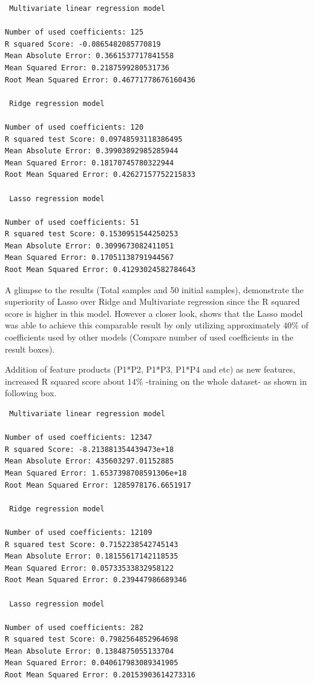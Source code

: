 \documentclass[12pt]{article}
\begin{document}
\begin{lstlisting}
 Multivariate linear regression model

Number of used coefficients: 125
R squared Score: -0.0865482085770819
Mean Absolute Error: 0.3661537717841558
Mean Squared Error: 0.2187599280531736
Root Mean Squared Error: 0.46771778676160436

 Ridge regression model

Number of used coefficients: 120
R squared test Score: 0.09748593118386495
Mean Absolute Error: 0.39903892985285944
Mean Squared Error: 0.18170745780322944
Root Mean Squared Error: 0.42627157752215833

 Lasso regression model

Number of used coefficients: 51
R squared test Score: 0.1530951544250253
Mean Absolute Error: 0.3099673082411051
Mean Squared Error: 0.17051138791944567
Root Mean Squared Error: 0.41293024582784643
\end{lstlisting}

A glimpse to the results (Total samples and 50 initial samples), demonstrate the superiority of Lasso over Ridge and Multivariate regression since the R squared score is higher in this model. However a closer look, shows that the Lasso model was able to achieve this comparable result by only utilizing approximately $40\%$ of coefficients used by other models (Compare number of used coefficients in the result boxes).

Addition of feature products (P1*P2, P1*P3, P1*P4 and etc) as new features, increased R squared score about $14\%$ -training on the whole dataset- as shown in following box.
\begin{lstlisting}
 Multivariate linear regression model

Number of used coefficients: 12347
R squared Score: -8.213881354439473e+18
Mean Absolute Error: 435603297.01152885
Mean Squared Error: 1.6537398708591306e+18
Root Mean Squared Error: 1285978176.6651917

 Ridge regression model

Number of used coefficients: 12109
R squared test Score: 0.7152238542745143
Mean Absolute Error: 0.18155617142118535
Mean Squared Error: 0.05733533832958122
Root Mean Squared Error: 0.239447986689346

 Lasso regression model

Number of used coefficients: 282
R squared test Score: 0.7982564852964698
Mean Absolute Error: 0.1384875055133704
Mean Squared Error: 0.040617983089341905
Root Mean Squared Error: 0.20153903614273316
\end{lstlisting}
\end{document}
